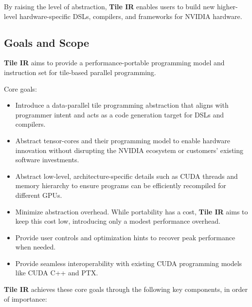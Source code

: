 \documentclass{article}
\begin{document}
By raising the level of abstraction, \textbf{Tile IR} enables users to build new higher-level hardware-specific DSLs, compilers, and frameworks for NVIDIA hardware.



\subsection{Goals and Scope}

\textbf{Tile IR} aims to provide a performance-portable programming model and instruction set for tile-based parallel programming.


Core goals:


\begin{itemize}
\item Introduce a data-parallel tile programming abstraction that aligns with programmer intent and acts as a code generation target for DSLs and compilers.
\item Abstract tensor-cores and their programming model to enable hardware innovation without disrupting the NVIDIA ecosystem or customers' existing software investments.
\item Abstract low-level, architecture-specific details such as CUDA threads and memory hierarchy to ensure programs can be efficiently recompiled for different GPUs.
\item Minimize abstraction overhead. While portability has a cost, \textbf{Tile IR} aims to keep this cost low, introducing only a modest performance overhead.
\item Provide user controls and optimization hints to recover peak performance when needed.
\item Provide seamless interoperability with existing CUDA programming models like CUDA C++ and PTX.

\end{itemize}
\textbf{Tile IR} achieves these core goals through the following key components, in order of importance:
\end{document}
